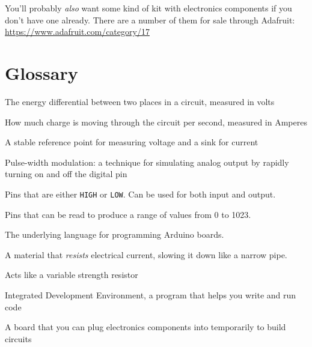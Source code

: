 \documentclass[letterpage,12pt]{article}
\begin{document}
You'll probably \textit{also} want some kind of kit with electronics components if you don't have one already. There are a number of them for sale through Adafruit: \url{https://www.adafruit.com/category/17}
\section*{Glossary}
\begin{description}
  \itemsep2pt
  \item[Voltage] The energy differential between two places in a circuit, measured in volts
  \item[Current] How much charge is moving through the circuit per second, measured in Amperes
  \item[Ground] A stable reference point for measuring voltage and a sink for current
  \item[PWM] Pulse-width modulation: a technique for simulating analog output by rapidly turning on and off the digital pin
  \item[Digital pins] Pins that are either \texttt{HIGH} or \texttt{LOW}. Can be used for both input and output.
  \item[Analog pins] Pins that can be read to produce a range of values from 0 to 1023.
  \item[C Programming Language] The underlying language for programming Arduino boards.
  \item[Resistor] A material that \textit{resists} electrical current, slowing it down like a narrow pipe.
  \item[Pot/Potentiometer] Acts like a variable strength resistor
  \item[IDE] Integrated Development Environment, a program that helps you write and run code
  \item[Breadboard] A board that you can plug electronics components into temporarily to build circuits
\end{description}
\end{document}
